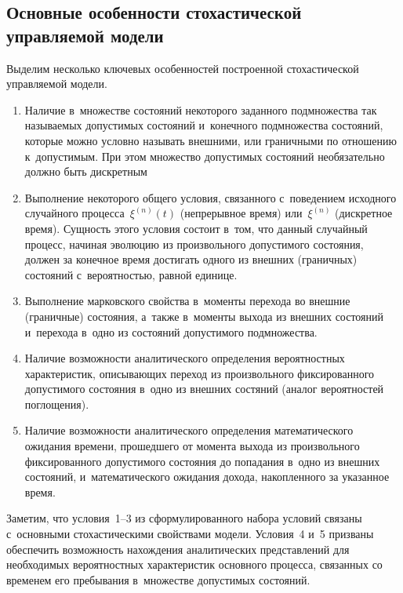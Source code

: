 \begin{multicols}{2}
\vspace*{-6pt}

\section{Основные особенности стохастической управляемой модели}

\vspace*{-3pt}

Выделим несколько ключевых особенностей построенной стохастической управляемой 
модели.
\begin{enumerate}
\item Наличие в~множестве состояний некоторого заданного подмножества так 
называемых до\-пус\-ти\-мых состояний и~конечного подмножества состояний, которые 
можно условно называть внешними, или граничными по отношению к~допустимым. При 
этом множество до\-пус\-ти\-мых состояний необязательно должно быть дискретным
\item Выполнение некоторого общего условия, связанного с~поведением исходного 
случайного процесса~$\xi^{(n)}(t)$ (непрерывное время) или~$\xi^{(n)}$ 
(дискретное время). Сущность этого условия состоит в~том, что данный случайный 
процесс, начиная эволюцию из произвольного допустимого состояния, должен за 
конечное время достигать одного из внешних (граничных) состояний с~вероятностью, 
равной единице.
\item Выполнение марковского свойства в~моменты перехода во внешние (граничные) 
состояния, а~также в~моменты выхода из внешних состояний и~перехода в~одно из 
состояний допустимого подмножества.
\item Наличие возможности аналитического определения вероятностных 
характеристик, описывающих переход из произвольного фиксированного допустимого 
состояния в~одно из внешних состяний (аналог вероятностей поглощения).
\item Наличие возможности аналитического определения математического ожидания 
времени, прошедшего от момента выхода из произвольного фиксированного 
допустимого состояния до попадания в~одно из внешних состояний, 
и~математического ожидания дохода, накопленного за указанное время.
\end{enumerate}

Заметим, что условия~1--3 из сформулированного набора условий связаны 
с~основными стохастическими свойствами модели. Условия~4 и~5 призваны обеспечить 
возможность нахождения \mbox{аналитических} представлений для необходимых вероятностных 
характеристик основного процесса, связанных со временем его пребывания 
в~множестве допустимых состояний.


\end{multicols}
